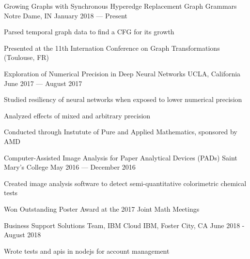 \begin{cventries}
  {Growing Graphs with Synchronous Hyperedge Replacement Graph Grammars}
  {Notre Dame, IN}
  {January 2018 --- Present}
  {\begin{cvitems}
    \item Parsed temporal graph data to find a CFG for its growth
    \item Presented at the 11th Internation Conference on Graph Transformations
      (Toulouse, FR)
    \end{cvitems}
  }
  {Exploration of Numerical Precision in Deep Neural Networks}
  {UCLA, California}
  {June 2017 --- August 2017}
  {\begin{cvitems}
    \item Studied resiliency of neural networks when exposed to lower numerical precision
    \item Analyzed effects of mixed and arbitrary precision
    \item Conducted through Instutute of Pure and Applied Mathematics, sponsored by AMD
    \end{cvitems}
  }
  {Computer-Assisted Image Analysis for Paper Analytical Devices (PADs)}
  {Saint Mary's College}
  {May 2016 --- December 2016}
  {\begin{cvitems}
    \item {Created image analysis software to detect semi-quantitative colorimetric chemical tests}
    \item {Won Outstanding Poster Award at the 2017 Joint Math Meetings}
    \end{cvitems}
  }
\end{cventries}

\begin{cventries}
  {Business Support Solutions Team, IBM Cloud}
  {IBM, Foster City, CA}
  {June 2018 - August 2018}
  {\begin{cvitems}
  \item Wrote tests and apis in nodejs for account management
  \end{cvitems}}
\end{cventries}
